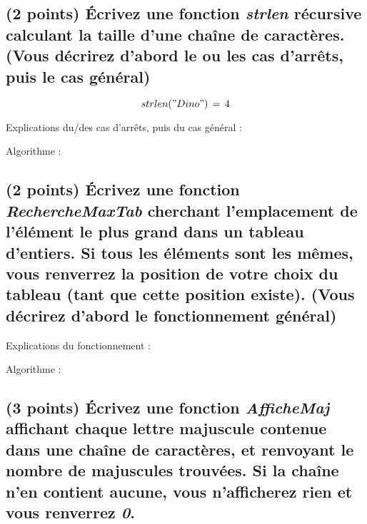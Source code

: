 \documentclass[11pt,a4paper]{article}
\begin{document}
\smallskip


\clearpage


\subsection{(2 points) \'Ecrivez une fonction \og \textit{strlen} \fg{} récursive calculant la taille d'une chaîne de caractères. (Vous décrirez d'abord le ou les cas d'arrêts, puis le cas général) }

\vspace*{-0.5cm}

\begin{center}

\begin{equation*}
strlen("Dino")  \, = \,  4
\end{equation*}

Explications du/des cas d'arrêts, puis du cas général :

\bigskip

Algorithme :
\end{center}

\smallskip


\clearpage


\subsection{(2 points) \'Ecrivez une fonction \og \textit{RechercheMaxTab} \fg{} cherchant l'emplacement de l'élément le plus grand dans un tableau d'entiers. Si tous les éléments sont les mêmes, vous renverrez la position de votre choix du tableau (tant que cette position existe). (Vous décrirez d'abord le fonctionnement général) }


\begin{center}
Explications du fonctionnement :

Algorithme :
\end{center}


\clearpage


\subsection{(3 points) \'Ecrivez une fonction \og \textit{AfficheMaj} \fg{} affichant chaque lettre majuscule contenue dans une chaîne de caractères, et renvoyant le nombre de majuscules trouvées. Si la chaîne n'en contient aucune, vous n'afficherez rien et vous renverrez \textit{0}. }
\end{document}
